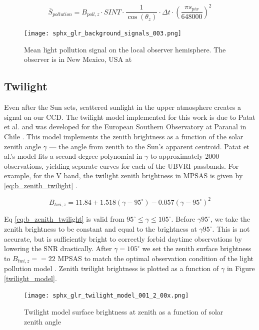 \begin{equation} \label{eq:pollution_adu}
  \bar{S}_{pollution} = B_{poll,z} \cdot SINT \cdot \frac{1}{\cos(\theta_z)} \cdot \Delta t \cdot \left( \frac{\pi s_{pix}}{648000} \right)^2
\end{equation}

\begin{figure}[ht]
  \centering
  \texttt{[image: sphx\_glr\_background\_signals\_003.png]}
  \caption{Mean light pollution signal on the local observer hemisphere. The observer is in New Mexico, USA at
  \pogslla}
  \label{fig:pollution_hemi}
\end{figure}

\subsection{Twilight}

Even after the Sun sets, scattered sunlight in the upper atmosphere creates a signal on our CCD. The twilight model implemented for this work is due to Patat et al. and was developed for the European Southern Observatory at Paranal in Chile \cite{patat2006}. This model implements the zenith brightness as a function of the solar zenith angle $\gamma$ --- the angle from zenith to the Sun's apparent centroid. Patat et al.'s model fits a second-degree polynomial in $\gamma$ to approximately 2000 observations, yielding separate curves for each of the UBVRI passbands. For example, for the V band, the twilight zenith brightness in MPSAS is given by \ref{eq:b_zenith_twilight} \cite{patat2006}.

\begin{equation} \label{eq:b_zenith_twilight}
  B_{twi,z} = 11.84 + 1.518(\gamma - 95^\circ) - 0.057 (\gamma -  95^\circ)^2
\end{equation}

Eq \ref{eq:b_zenith_twilight} is valid from $95^\circ \leq \gamma \leq 105^\circ$. Before $\gamma 95^\circ$, we take the zenith brightness to be constant and equal to the brightness at $\gamma 95^\circ$. This is not accurate, but is sufficiently bright to correctly forbid daytime observations by lowering the SNR drastically. After $\gamma = 105^\circ$ we set the zenith surface brightness to $B_{twi,z} == 22$ MPSAS to match the optimal observation condition of the light pollution model \cite{krag2003}. Zenith twilight brightness is plotted as a function of $\gamma$ in Figure \ref{twilight_model}.

\begin{figure}[ht]
  \centering
  \texttt{[image: sphx\_glr\_twilight\_model\_001\_2\_00x.png]}
  \caption{Twilight model surface brightness at zenith as a function of solar zenith angle}
  \label{fig:twilight_model}
\end{figure}

